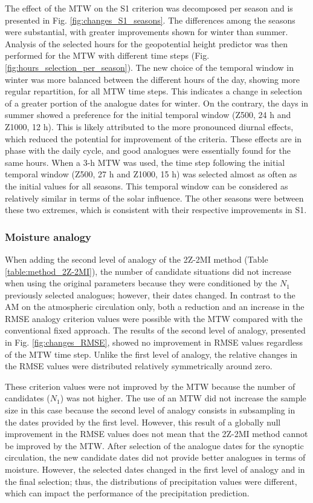 \documentclass[hess, manuscript]{copernicus}
\begin{document}
	The effect of the MTW on the S1 criterion was decomposed per season and is presented in Fig. \ref{fig:changes_S1_seasons}. The differences among the seasons were substantial, with greater improvements shown for winter than summer. Analysis of the selected hours for the geopotential height predictor was then performed for the MTW with different time steps (Fig. \ref{fig:hours_selection_per_season}). The new choice of the temporal window in winter was more balanced between the different hours of the day, showing more regular repartition, for all MTW time steps. This indicates a change in selection of a greater portion of the analogue dates for winter. On the contrary, the days in summer showed a preference for the initial temporal window (Z500, 24 h and Z1000, 12 h). This is likely attributed to the more pronounced diurnal effects, which reduced the potential for improvement of the criteria. These effects are in phase with the daily cycle, and good analogues were essentially found for the same hours. When a 3-h MTW was used, the time step following the initial temporal window (Z500, 27 h and Z1000, 15 h) was selected almost as often as the initial values for all seasons. This temporal window can be considered as relatively similar in terms of the solar influence. The other seasons were between these two extremes, which is consistent with their respective improvements in S1.
	
	
	\subsubsection{Moisture analogy}
	\label{sec:changes_analogy_moisture}
	
	When adding the second level of analogy of the 2Z-2MI method (Table \ref{table:method_2Z-2MI}), the number of candidate situations did not increase when using the original parameters because they were conditioned by the $N_{1}$ previously selected analogues; however, their dates changed. In contrast to the AM on the atmospheric circulation only, both a reduction and an increase in the RMSE analogy criterion values were possible with the MTW compared with the conventional fixed approach. The results of the second level of analogy, presented in Fig. \ref{fig:changes_RMSE}, showed no improvement in RMSE values regardless of the MTW time step. Unlike the first level of analogy, the relative changes in the RMSE values were distributed relatively symmetrically around zero.
	
	These criterion values were not improved by the MTW because the number of candidates ($N_{1}$) was not higher. The use of an MTW did not increase the sample size in this case because the second level of analogy consists in subsampling in the dates provided by the first level. However, this result of a globally null improvement in the RMSE values does not mean that the 2Z-2MI method cannot be improved by the MTW. After selection of the analogue dates for the synoptic circulation, the new candidate dates did not provide better analogues in terms of moisture. However, the selected dates changed in the first level of analogy and in the final selection; thus, the distributions of precipitation values were different, which can impact the performance of the precipitation prediction.
	
\end{document}
